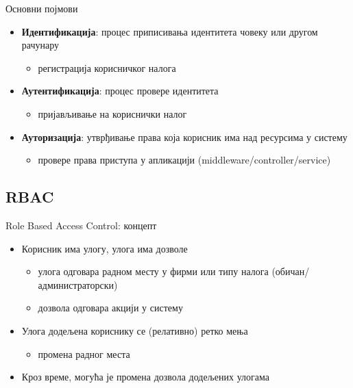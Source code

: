 \documentclass{beamer}
\begin{document}
    \begin{frame}{Основни појмови}
        \begin{itemize}
            \item \textbf{Идентификација}: процес приписивања идентитета човеку или другом рачунару
            \begin{itemize}
                \item регистрација корисничког налога
            \end{itemize}
            \item \textbf{Аутентификација}: процес провере идентитета
            \begin{itemize}
                \item пријављивање на кориснички налог
            \end{itemize}
            \item \textbf{Ауторизација}: утврђивање права која корисник има над ресурсима у систему
            \begin{itemize}
                \item провере права приступа у апликацији (middleware/controller/service)
            \end{itemize}
        \end{itemize}
    \end{frame}
    
    \subsection{RBAC}
    
    \begin{frame}{Role Based Access Control: концепт}
        \begin{itemize}
            \item Корисник има улогу, улога има дозволе
            \begin{itemize}
                \item улога одговара радном месту у фирми или типу налога (обичан/администраторски)
                \item дозвола одговара акцији у систему
            \end{itemize}
            \item Улога додељена кориснику се (релативно) ретко мења
            \begin{itemize}
                \item промена радног места
            \end{itemize}
            \item Кроз време, могућа је промена дозвола додељених улогама
        \end{itemize}
    \end{frame}
    
\end{document}
